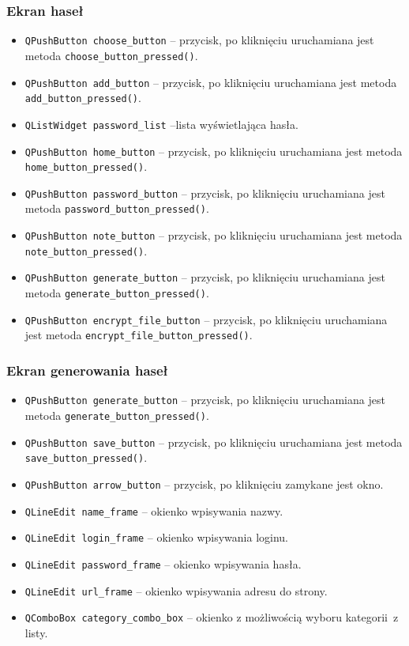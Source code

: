 \documentclass[a4paper]{article}
\newcommand{\prog}{\texttt}
\begin{document}
\subsubsection{Ekran haseł}
\begin{itemize}
    \item \prog{QPushButton choose\_button} -- przycisk, po kliknięciu uruchamiana jest metoda \prog{choose\_button\_pressed()}.
    \item \prog{QPushButton add\_button} -- przycisk, po kliknięciu uruchamiana jest metoda \prog{add\_button\_pressed()}.
    \item \prog{QListWidget password\_list} --lista wyświetlająca hasła.
    \item \prog{QPushButton home\_button} -- przycisk, po kliknięciu uruchamiana jest metoda \prog{home\_button\_pressed()}.
    \item \prog{QPushButton password\_button} -- przycisk, po kliknięciu uruchamiana jest metoda \prog{password\_button\_pressed()}.
    \item \prog{QPushButton note\_button} -- przycisk, po kliknięciu uruchamiana jest metoda \prog{note\_button\_pressed()}.
    \item \prog{QPushButton generate\_button} -- przycisk, po kliknięciu uruchamiana jest metoda \prog{generate\_button\_pressed()}.
    \item \prog{QPushButton encrypt\_file\_button} -- przycisk, po kliknięciu uruchamiana jest metoda \prog{encrypt\_file\_button\_pressed()}.
\end{itemize}

\subsubsection{Ekran generowania haseł}
\begin{itemize}
    \item \prog{QPushButton generate\_button} -- przycisk, po kliknięciu uruchamiana jest metoda \prog{generate\_button\_pressed()}.
    \item \prog{QPushButton save\_button} -- przycisk, po kliknięciu uruchamiana jest metoda \prog{save\_button\_pressed()}.
    \item \prog{QPushButton arrow\_button} -- przycisk, po kliknięciu zamykane jest okno.
    \item \prog{QLineEdit name\_frame} -- okienko wpisywania nazwy.
    \item \prog{QLineEdit login\_frame} -- okienko wpisywania loginu.
    \item \prog{QLineEdit password\_frame} -- okienko wpisywania hasła.
    \item \prog{QLineEdit url\_frame} -- okienko wpisywania adresu do strony.
    \item \prog{QComboBox category\_combo\_box} -- okienko z możliwością wyboru kategorii~z listy.
\end{itemize}
\end{document}
